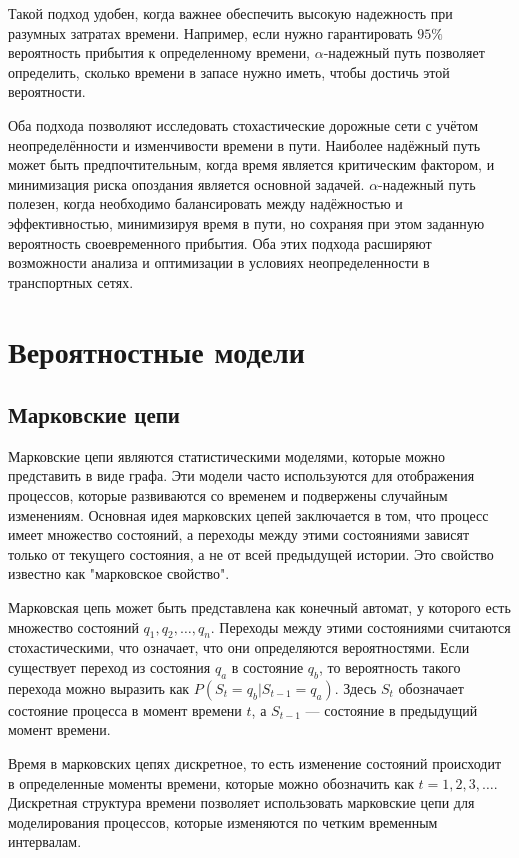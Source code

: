 Такой подход удобен, когда важнее обеспечить высокую надежность при разумных затратах времени. Например, если нужно гарантировать $95\%$ вероятность прибытия к определенному времени, $\alpha$-надежный путь позволяет определить, сколько времени в запасе нужно иметь, чтобы достичь этой вероятности.

Оба подхода позволяют исследовать стохастические дорожные сети с учётом неопределённости и изменчивости времени в пути. Наиболее надёжный путь может быть предпочтительным, когда время является критическим фактором, и минимизация риска опоздания является основной задачей. $\alpha$-надежный путь полезен, когда необходимо балансировать между надёжностью и эффективностью, минимизируя время в пути, но сохраняя при этом заданную вероятность своевременного прибытия. Оба этих подхода расширяют возможности анализа и оптимизации в условиях неопределенности в транспортных сетях.



\section{Вероятностные модели}


\subsection{Марковские цепи}


Марковские цепи являются статистическими моделями, которые можно представить в виде графа. Эти модели часто используются для отображения процессов, которые развиваются со временем и подвержены случайным изменениям. Основная идея марковских цепей заключается в том, что процесс имеет множество состояний, а переходы между этими состояниями зависят только от текущего состояния, а не от всей предыдущей истории. Это свойство известно как "марковское свойство".

Марковская цепь может быть представлена как конечный автомат, у которого есть множество состояний $q_1, q_2, \ldots, q_n$. Переходы между этими состояниями считаются стохастическими, что означает, что они определяются вероятностями. Если существует переход из состояния $q_a$ в состояние $q_b$, то вероятность такого перехода можно выразить как $P(S_t = q_b | S_{t - 1} = q_a)$. Здесь $S_t$ обозначает состояние процесса в момент времени $t$, а $S_{t - 1}$ — состояние в предыдущий момент времени.

Время в марковских цепях дискретное, то есть изменение состояний происходит в определенные моменты времени, которые можно обозначить как $t = 1, 2, 3, \ldots$. Дискретная структура времени позволяет использовать марковские цепи для моделирования процессов, которые изменяются по четким временным интервалам.

